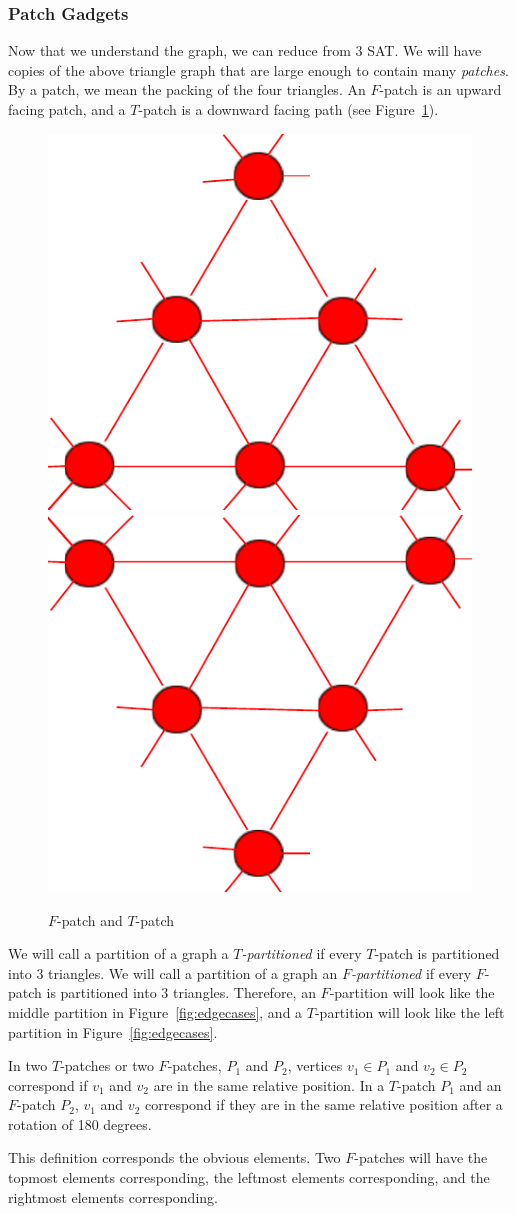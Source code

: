 \documentclass[runningheads,a4paper]{llncs}
\begin{document}
\subsubsection{Patch Gadgets}

Now that we understand the graph, we can reduce from 3 SAT. We will have copies of the above triangle graph that are large enough to contain many \emph{patches}. By a patch, we mean the packing of the four triangles. An $F$-patch is an upward facing patch, and a $T$-patch is a downward facing path (see Figure~\ref{fig:patches}).

\begin{figure}[h]
\label{fig:patches}
\centering
\includegraphics[width=0.2\linewidth]{Tpatch.pdf} \qquad
\includegraphics[width=0.2\linewidth]{Fpatch.pdf}
\caption{$F$-patch and $T$-patch}
\end{figure}

We will call a partition of a graph a \emph{$T$-partitioned} if every $T$-patch is partitioned into 3 triangles. We will call a partition of a graph an \emph{$F$-partitioned} if every $F$-patch is partitioned into $3$ triangles. Therefore, an $F$-partition will look like the middle partition in Figure~\ref{fig:edgecases}, and a $T$-partition will look like the left partition in Figure~\ref{fig:edgecases}.

\begin{definition}
In two $T$-patches or two $F$-patches, $P_1$ and $P_2$, vertices $v_1 \in P_1$ and $v_2 \in P_2$ correspond if $v_1$ and $v_2$ are in the same relative position. In a $T$-patch $P_1$ and an $F$-patch $P_2$, $v_1$ and $v_2$ correspond if they are in the same relative position after a rotation of 180 degrees.
\end{definition}

This definition corresponds the obvious elements. Two $F$-patches will have the topmost elements corresponding, the leftmost elements corresponding, and the rightmost elements corresponding. 
\end{document}
